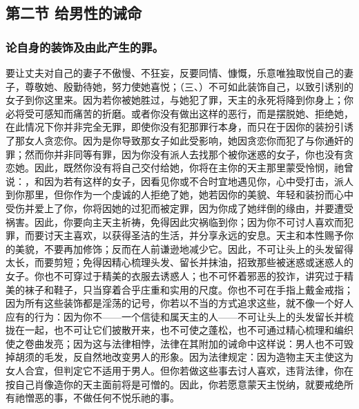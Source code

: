 
\subsection{第二节 给男性的诫命}


\subsubsection{论自身的装饰及由此产生的罪。}

要让丈夫对自己的妻子不傲慢、不狂妄，反要同情、慷慨，乐意唯独取悦自己的妻子，尊敬她、殷勤待她，努力使她喜悦；（三、）不可如此装饰自己，以致引诱别的女子到你这里来。因为若你被她胜过，与她犯了罪，天主的永死将降到你身上；你必将受可感知而痛苦的折磨。或者你没有做出这样的恶行，而是摆脱她、拒绝她，在此情况下你并非完全无罪，即使你没有犯那罪行本身，而只在于因你的装扮引诱了那女人贪恋你。因为是你导致那女子如此受影响，她因贪恋你而犯了与你通奸的罪；然而你并非同等有罪，因为你没有派人去找那个被你迷惑的女子，你也没有贪恋她。因此，既然你没有将自己交付给她，你将在主你的天主那里蒙受怜悯，祂曾说：，和因为若有这样的女子，因看见你或不合时宜地遇见你，心中受打击，派人到你那里，但你作为一个虔诚的人拒绝了她，她若因你的美貌、年轻和装扮而心中受伤并爱上了你，你将因她的过犯而被定罪，因为你成了她绊倒的缘由，并要遭受祸害。因此，你要向主天主祈祷，免得因此灾祸临到你；因为你不可讨人喜欢而犯罪，而要讨天主喜欢，以获得圣洁的生活，并分享永远的安息。天主和本性赐予你的美貌，不要再加修饰；反而在人前谦逊地减少它。因此，不可让头上的头发留得太长，而要剪短；免得因精心梳理头发、留长并抹油，招致那些被迷惑或迷惑人的女子。你也不可穿过于精美的衣服去诱惑人；也不可怀着邪恶的狡诈，讲究过于精美的袜子和鞋子，只当穿着合乎庄重和实用的尺度。你也不可在手指上戴金戒指；因为所有这些装饰都是淫荡的记号，你若以不当的方式追求这些，就不像一个好人应有的行为：因为你不——一个信徒和属天主的人——不可让头上的头发留长并梳拢在一起，也不可让它们披散开来，也不可使之蓬松，也不可通过精心梳理和编织使之卷曲发亮；因为这与法律相悖，法律在其附加的诫命中这样说：男人也不可毁掉胡须的毛发，反自然地改变男人的形象。因为法律规定：因为造物主天主使这为女人合宜，但判定它不适用于男人。但你若做这些事去讨人喜欢，违背法律，你在按自己肖像造你的天主面前将是可憎的。因此，你若愿意蒙天主悦纳，就要戒绝所有祂憎恶的事，不做任何不悦乐祂的事。\par

